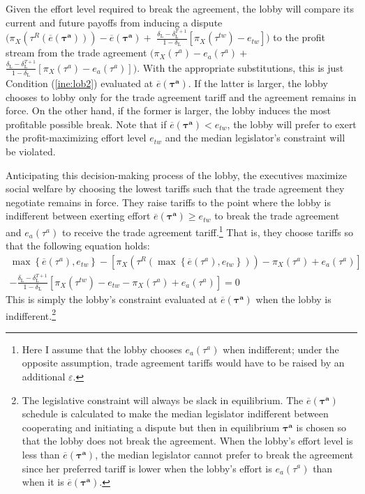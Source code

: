 \documentclass[authoryear, review]{elsarticle}
\newcommand{\ov}{\overline}
\newcommand{\bta}{\bm{\tau^a}}
\newcommand{\de}{\delta}
\begin{document}
Given the effort level required to break the agreement, the lobby will compare its current and future payoffs from inducing a dispute $\Big(\pi_X(\tau^R(\ov{e}(\bta))) - \ov{e}(\bta) +$ $\frac{\de_\text{L} - \de_\text{L}^{T+1}}{1-\de_\text{L}} \left[\pi_X(\tau^{tw}) -e_{tw}\right] \Big)$ to the profit stream from the trade agreement $\Big(\pi_X(\tau^a) - e_a(\tau^a) +$ $\frac{\de_\text{L} - \de_\text{L}^{T+1}}{1-\de_\text{L}} \left[\pi_X(\tau^a) -e_a(\tau^a)\right] \Big)$. With the appropriate substitutions, this is just Condition (\ref{ine:lob2}) evaluated at $\ov{e}(\bta)$. If the latter is larger, the lobby chooses to lobby only for the trade agreement tariff and the agreement remains in force. On the other hand, if the former is larger, the lobby induces the most profitable possible break. Note that if $\ov{e}(\bta) < e_{tw}$, the lobby will prefer to exert the profit-maximizing effort level $e_{tw}$ and the median legislator's constraint will be violated. 


Anticipating this decision-making process of the lobby, the executives maximize social welfare by choosing the lowest tariffs such that the trade agreement they negotiate remains in force. They raise tariffs to the point where the lobby is indifferent between exerting effort $\ov{e}(\bta)\geq e_{tw}$ to break the trade agreement and $e_a(\tau^a)$ to receive the trade agreement tariff.\footnote{Here I assume that the lobby chooses $e_a(\tau^a)$ when indifferent; under the opposite assumption, trade agreement tariffs would have to be raised by an additional $\varepsilon$.} That is, they choose tariffs so that the following equation holds:
\begin{multline}
  \max \left\{\ov{e}(\tau^a), e_{tw}\right\} - \left[ \pi_X(\tau^R(\max \left\{\ov{e}(\tau^a), e_{tw}\right\})) - \pi_X(\tau^a) + e_a(\tau^a)\right] \\
	- \frac{\de_\text{L} - \de_\text{L}^{T+1}}{1-\de_\text{L}} \left[\pi_X(\tau^{tw}) -e_{tw} - \pi_X(\tau^a) + e_a(\tau^a) \right] = 0
  \label{eq:lob2}
\end{multline}
This is simply the lobby's constraint evaluated at $\ov{e}(\bta)$ when the lobby is indifferent.\footnote{The legislative constraint will always be slack in equilibrium. The $\ov{e}(\bta)$ schedule is calculated to make the median legislator indifferent between cooperating and initiating a dispute but then in equilibrium $\bta$ is chosen so that the lobby does not break the agreement. When the lobby's effort level is less than $\ov{e}(\bta)$, the median legislator cannot prefer to break the agreement since her preferred tariff is lower when the lobby's effort is $e_a(\tau^a)$ than when it is $\ov{e}(\bta)$.}
\end{document}
